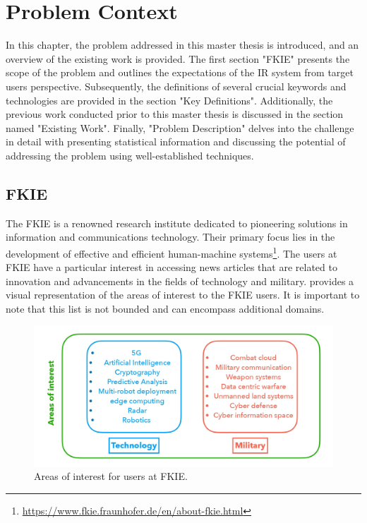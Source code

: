 
\chapter{Problem Context}

In this chapter, the problem addressed in this master thesis is introduced, and an overview of the existing work is provided. The first section "FKIE" presents the scope of the problem and outlines the expectations of the \ac{IR} system from target users perspective. Subsequently, the definitions of several crucial keywords and technologies are provided in the section "Key Definitions". Additionally, the previous work conducted prior to this master thesis is discussed in the section named "Existing Work". Finally, "Problem Description" delves into the challenge in detail with presenting statistical information and discussing the potential of addressing the problem using well-established techniques.

	\section{FKIE}

The \ac{FKIE} is a renowned research institute dedicated to pioneering solutions in information and communications technology. Their primary focus lies in the development of effective and efficient human-machine systems\footnote{\url{https://www.fkie.fraunhofer.de/en/about-fkie.html}}. The users at \ac{FKIE} have a particular interest in accessing news articles that are related to  innovation and advancements in the fields of technology and military.  provides a visual representation of the areas of interest to the \ac{FKIE} users. It is important to note that this list is not bounded and can encompass additional domains.

\begin{figure}[h!]
	\centering
	\includegraphics[width=.8\textwidth]{images/keynotes_images/areas_of_interest.jpg}
	\caption{Areas of interest for users at FKIE. \label{fig:areas_of_interest}}
\end{figure} 

